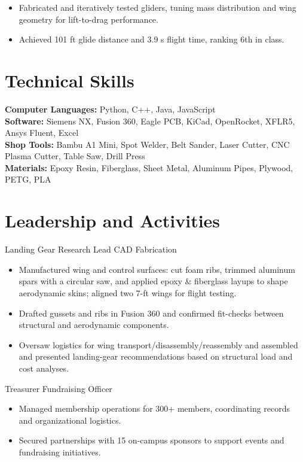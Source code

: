 \begin{itemize}
  \item Fabricated and iteratively tested gliders, tuning mass distribution and wing geometry for lift-to-drag performance.
  \item Achieved 101 ft glide distance and 3.9 s flight time, ranking 6th in class.
\end{itemize}

\section{Technical Skills}
\textbf{Computer Languages:} Python, C++, Java, JavaScript\\
\textbf{Software:} Siemens NX, Fusion 360, Eagle PCB, KiCad, OpenRocket, XFLR5, Ansys Fluent, Excel\\
\textbf{Shop Tools:} Bambu A1 Mini, Spot Welder, Belt Sander, Laser Cutter, CNC Plasma Cutter, Table Saw, Drill Press\\
\textbf{Materials:} Epoxy Resin, Fiberglass, Sheet Metal, Aluminum Pipes, Plywood, PETG, PLA

\section{Leadership and Activities}

Landing Gear Research Lead \textbar{} CAD \textbar{} Fabrication
\begin{itemize}
  \item Manufactured wing and control surfaces: cut foam ribs, trimmed aluminum spars with a circular saw, and applied epoxy \& fiberglass layups to shape aerodynamic skins; aligned two 7-ft wings for flight testing.
  \item Drafted gussets and ribs in Fusion 360 and confirmed fit-checks between structural and aerodynamic components.
  \item Oversaw logistics for wing transport/disassembly/reassembly and assembled and presented landing-gear recommendations based on structural load and cost analyses.
\end{itemize}
\entrygap

Treasurer \textbar{} Fundraising Officer
\begin{itemize}
  \item Managed membership operations for 300+ members, coordinating records and organizational logistics.
  \item Secured partnerships with 15 on-campus sponsors to support events and fundraising initiatives.
\end{itemize}


